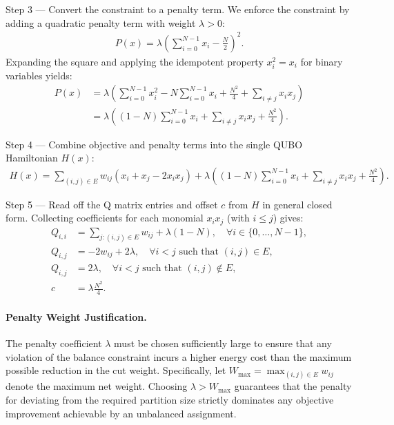 \documentclass[12pt]{article}
\begin{document}
Step 3 --- Convert the constraint to a penalty term. We enforce the constraint by adding a quadratic penalty term with weight $\lambda > 0$:
\begin{align}
    P(x) = \lambda \left( \sum_{i=0}^{N-1} x_i - \frac{N}{2} \right)^2.
\end{align}
Expanding the square and applying the idempotent property $x_i^2 = x_i$ for binary variables yields:
\begin{align}
    P(x) &= \lambda \left( \sum_{i=0}^{N-1} x_i^2 - N \sum_{i=0}^{N-1} x_i + \frac{N^2}{4} + \sum_{i \neq j} x_i x_j \right) \\
    &= \lambda \left( (1 - N) \sum_{i=0}^{N-1} x_i + \sum_{i \neq j} x_i x_j + \frac{N^2}{4} \right).
\end{align}

Step 4 --- Combine objective and penalty terms into the single QUBO Hamiltonian $H(x)$:
\begin{align}
    H(x) = \sum_{(i,j) \in E} w_{ij} (x_i + x_j - 2x_i x_j) + \lambda \left( (1 - N) \sum_{i=0}^{N-1} x_i + \sum_{i \neq j} x_i x_j + \frac{N^2}{4} \right).
\end{align}

Step 5 --- Read off the Q matrix entries and offset $c$ from $H$ in general closed form. Collecting coefficients for each monomial $x_i x_j$ (with $i \leq j$) gives:
\begin{align}
    Q_{i,i} &= \sum_{j : (i,j) \in E} w_{ij} + \lambda(1 - N), \quad \forall i \in \{0, \dots, N-1\}, \\
    Q_{i,j} &= -2w_{ij} + 2\lambda, \quad \forall i < j \text{ such that } (i,j) \in E, \\
    Q_{i,j} &= 2\lambda, \quad \forall i < j \text{ such that } (i,j) \notin E, \\
    c &= \lambda \frac{N^2}{4}.
\end{align}

\paragraph{Penalty Weight Justification.}
The penalty coefficient $\lambda$ must be chosen sufficiently large to ensure that any violation of the balance constraint incurs a higher energy cost than the maximum possible reduction in the cut weight. Specifically, let $W_{\max} = \max_{(i,j) \in E} w_{ij}$ denote the maximum net weight. Choosing $\lambda > W_{\max}$ guarantees that the penalty for deviating from the required partition size strictly dominates any objective improvement achievable by an unbalanced assignment.
\end{document}
